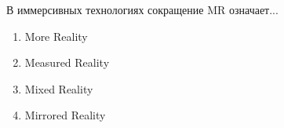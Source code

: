 
В иммерсивных технологиях сокращение MR означает...

\begin{enumerate}
    \item More Reality
    \item Measured Reality
    \item Mixed Reality
    \item Mirrored Reality
\end{enumerate}

